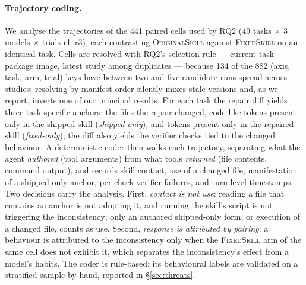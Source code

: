 \paragraph{Trajectory coding.} We analyse the trajectories of the 441 paired cells used by RQ2 (49
tasks $\times$ 3 models $\times$ trials r1--r3), each contrasting \textsc{OriginalSkill} against
\textsc{FixedSkill} on an identical task. Cells are resolved with RQ2's selection rule --- current
task-package image, latest study among duplicates --- because 134 of the 882 (axis, task, arm, trial)
keys have between two and five candidate runs spread across studies; resolving by manifest order
silently mixes stale versions and, as we report, inverts one of our principal results. For each task
the repair diff yields three task-specific anchors: the files the repair changed, code-like tokens
present only in the shipped skill (\emph{shipped-only}), and tokens present only in the repaired skill
(\emph{fixed-only}); the diff also yields the verifier checks tied to the changed behaviour. A
deterministic coder then walks each trajectory, separating what the agent \emph{authored} (tool
arguments) from what tools \emph{returned} (file contents, command output), and records skill contact,
use of a changed file, manifestation of a shipped-only anchor, per-check verifier failures, and
turn-level timestamps. Two decisions carry the analysis. First, \emph{contact is not use}: reading a
file that contains an anchor is not adopting it, and running the skill's script is not triggering the
inconsistency; only an authored shipped-only form, or execution of a changed file, counts as use.
Second, \emph{response is attributed by pairing}: a behaviour is attributed to the inconsistency only
when the \textsc{FixedSkill} arm of the same cell does not exhibit it, which separates the
inconsistency's effect from a model's habits. The coder is rule-based; its behavioural labels are
validated on a stratified sample by hand, reported in \S\ref{sec:threats}.

